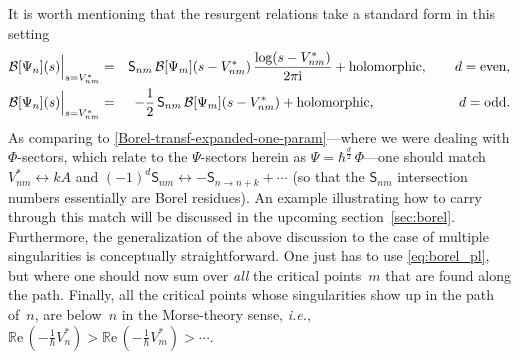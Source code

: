 \documentclass[11pt,a4paper]{article}
\newcommand{\CB}{{\cal B}}
\def\re{{\mathbb{R}}{\mathrm{e}}}
\newcommand{\rmi}{{\mathrm{i}}}
\begin{document}
It is worth mentioning that the resurgent relations take a standard form in this setting \cite{dh02}
%
\begin{eqnarray}
\label{eq:B_Psi_n:d=even}
\CB[\Psi_n](s) \Big|_{s=V^*_{nm}} &=& \mathsf{S}_{nm}\, \CB[\Psi_m] (s-V^*_{nm})\, \frac{\log (s-V^*_{nm})}{2\pi\rmi} + \text{holomorphic}, \qquad d = \text{even}, \\
\label{eq:B_Psi_n:d=odd}
\CB[\Psi_n](s) \Big|_{s=V^*_{nm}} &=& - \frac{1}{2}\, \mathsf{S}_{nm}\, \CB[\Psi_m] (s-V^*_{nm}) + \text{holomorphic}, \qquad\qquad\qquad\, d = \text{odd}.
\end{eqnarray}
%
\noindent
As comparing to \eqref{Borel-transf-expanded-one-param}---where we were dealing with $\Phi$-sectors, which relate to the $\Psi$-sectors herein as $\Psi = \hbar^{\frac{d}{2}}\, \Phi$---one should match $V^*_{nm} \leftrightarrow k A$ and $\left(-1\right)^d \mathsf{S}_{nm} \leftrightarrow - \mathsf{S}_{n\to n+k} + \cdots$ (so that the $\mathsf{S}_{nm}$ intersection numbers essentially are Borel residues). An example illustrating how to carry through this match will be discussed in the upcoming section~\ref{sec:borel}. Furthermore, the generalization of the above discussion to the case of multiple singularities is conceptually straightforward. One just has to use \eqref{eq:borel_pl}, but where one should now sum over \textit{all} the critical points~$m$ that are found along the path. Finally, all the critical points whose singularities show up in the path of~$n$, are below~$n$ in the Morse-theory sense, \textit{i.e.}, $\re\, ( - \frac{1}{\hbar} V^*_n ) > \re\, ( - \frac{1}{\hbar} V^*_m ) > \cdots$.
\end{document}
